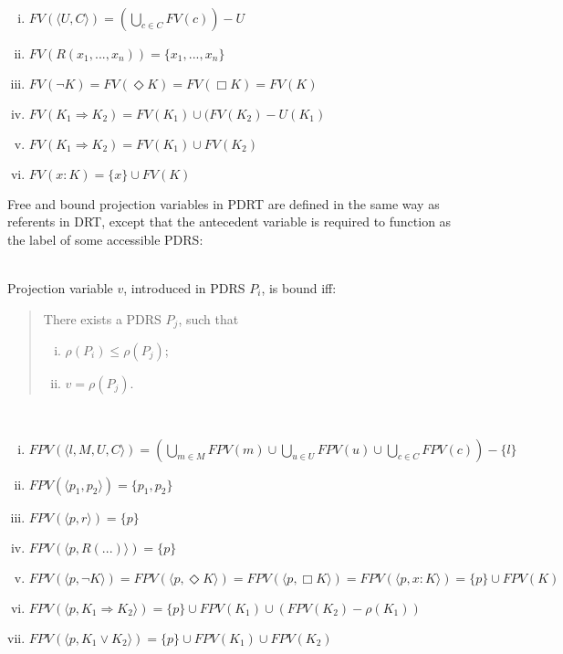 \begin{definition}~ %
  \begin{enumerate}[i.]
    \item $FV(\langle U, C \rangle) = (\bigcup_{c\in C} FV(c)) - U$
    \item $FV(R(x_1,...,x_n)) = \{x_1,...,x_n\}$
    \item $FV(\neg K) = FV(\Diamond K) = FV(\Box K) = FV(K)$
    \item $FV(K_1 \Rightarrow K_2) = FV(K_1) \cup (FV(K_2) - U(K_1)$
    \item $FV(K_1 \Rightarrow K_2) = FV(K_1) \cup FV(K_2)$
    \item $FV(x:K) = \{x\} \cup FV(K)$
  \end{enumerate}
\end{definition}


Free and bound projection variables in PDRT are defined in the same way as
referents in DRT, except that the antecedent variable is required to
function as the label of some accessible PDRS:

\begin{definition}~\\
Projection variable $v$, introduced in PDRS $P_i$, is bound iff:
\begin{quote}
There exists a PDRS $P_j$, such that
\begin{enumerate}[i.]
  \item $\rho(P_i) \leq \rho(P_j)$; 
  \item $v = \rho(P_j)$.
\end{enumerate}
\end{quote}
\end{definition}

\begin{definition}~
  \begin{enumerate}[i.]
    \item $FPV(\langle l, M, U, C \rangle) = (\bigcup_{m\in M} FPV(m) \cup \bigcup_{u\in U} FPV(u) \cup \bigcup_{c\in C} FPV(c)) - \{l\}$
    \item $FPV(\langle p_1, p_2\rangle) = \{p_1, p_2\}$
    \item $FPV(\langle p, r\rangle) = \{p\}$
    \item $FPV(\langle p, R(...)\rangle) = \{p\}$
    \item $FPV(\langle p,\neg K\rangle) = FPV(\langle p,\Diamond K\rangle) = FPV(\langle p,\Box K\rangle) = FPV(\langle p,x:K\rangle) = \{p\} \cup FPV(K)$
    \item $FPV(\langle p,K_1 \Rightarrow K_2\rangle) = \{p\}\cup FPV(K_1) \cup (FPV(K_2) - \rho(K_1))$
    \item $FPV(\langle p,K_1 \vee K_2\rangle) = \{p\}\cup FPV(K_1) \cup FPV(K_2)$
  \end{enumerate}
\end{definition}


